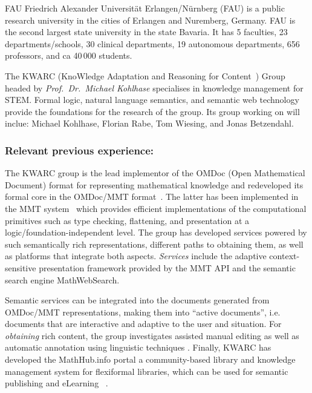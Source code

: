 \begin{sitedescription}{FAU}
  Friedrich Alexander Universit\"at Erlangen/N\"urnberg (FAU) is a public research
  university in the cities of Erlangen and Nuremberg, Germany. FAU is the second largest
  state university in the state Bavaria. It has 5 faculties, 23 departments/schools, 30
  clinical departments, 19 autonomous departments, 656 professors, and ca 40\,000
  students.

  The KWARC (KnoWledge Adaptation and Reasoning for Content~\cite{KWARC:online}) Group
  headed by {\emph{Prof.\ Dr.\ Michael Kohlhase}} specialises in knowledge management for
  STEM.  Formal logic, natural language semantics, and semantic web technology provide the
  foundations for the research of the group. Its group working on \pn will inclue: Michael
  Kohlhase, Florian Rabe, Tom Wiesing, and Jonas Betzendahl.

% 
% 
% 

\subsubsection*{Relevant previous experience:}

The KWARC group is the lead implementor of the OMDoc (Open Mathematical Document) format
for representing mathematical knowledge \cite{Kohlhase:OMDoc1.2} and redeveloped its
formal core in the OMDoc/MMT format~\cite{RabKoh:WSMSML13}. The latter has been
implemented in the MMT system~\cite{MMTSVN:on,RabKoh:WSMSML13} which provides efficient
implementations of the computational primitives such as type checking, flattening, and
presentation at a logic/foundation-independent level.  The group has developed services
powered by such semantically rich representations, different paths to obtaining them, as
well as platforms that integrate both aspects.  \emph{Services} include the adaptive
context-sensitive presentation framework provided by the MMT API and the semantic search
engine MathWebSearch\cite{KohSuc:asemf06,ProKoh:mwssofse12}. 

Semantic services can be integrated into the documents generated from OMDoc/MMT
representations, making them into ``active documents'', i.e. documents that are
interactive and adaptive to the user and situation.  For \emph{obtaining} rich content,
the group investigates assisted manual editing \cite{JucKoh:sidesc10:biblatex} as well as
automatic annotation using linguistic techniques \cite{GinJucAnc:alsaacl09}.  Finally,
KWARC has developed the \textsf{MathHub.info} portal a community-based library and
knowledge management system for flexiformal libraries, which can be used for semantic
publishing and eLearning~ \cite{KohDavGin:psewads11,MathHub:on,IanJucKoh:sdm14}.


\end{sitedescription}
